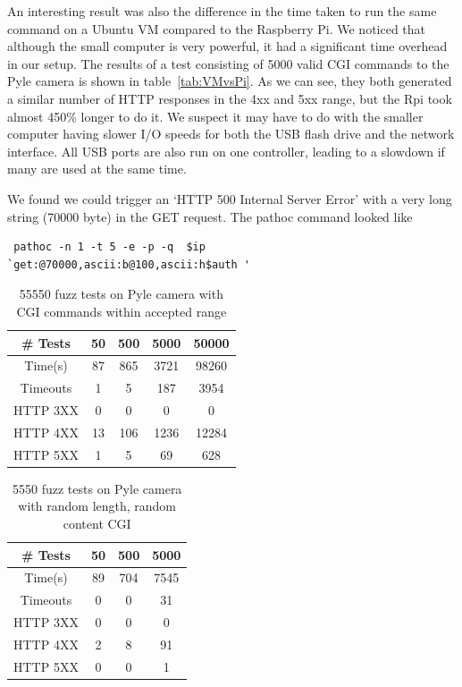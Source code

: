 \documentclass[letterpaper,twocolumn,10pt]{article}
\begin{document}
An interesting result was also the difference in the time taken to run the same command on a Ubuntu VM compared to the Raspberry Pi. We noticed that although the small computer is very powerful, it had a significant time overhead in our setup. The results of a test consisting of 5000 valid CGI commands to the Pyle camera is shown in table~\ref{tab:VMvsPi}. As we can see, they both generated a similar number of HTTP responses in the 4xx and 5xx range, but the Rpi took almost 450\% longer to do it. We suspect it may have to do with the smaller computer having slower I/O speeds for both the USB flash drive and the network interface. All USB ports are also run on one controller, leading to a slowdown if many are used at the same time.

We found we could trigger an `HTTP 500 Internal Server Error' with a very long string (70000 byte) in the GET request. The pathoc command looked like 
\begin{verbatim} pathoc -n 1 -t 5 -e -p -q  $ip 
`get:@70000,ascii:b@100,ascii:h$auth '  \end{verbatim}

\begin{table}[h]
\centering
	\begin{tabular}{ |c|c|c|c|c| }
		\hline
		\# Tests & 50 & 500 & 5000 & 50000 \\
		\hline
		\hline
		Time(s) & 87 & 865 & 3721 & 98260\\
		Timeouts & 1 & 5 & 187 & 3954 \\
		HTTP 3XX & 0 & 0 & 0 & 0\\
		HTTP 4XX & 13 & 106 & 1236 & 12284\\
		HTTP 5XX & 1 & 5 & 69 & 628\\
		\hline
	\end{tabular}
	\caption{55550 fuzz tests on Pyle camera with CGI commands within accepted range}
	\label{tab:Pyle_Good_CGI} 
\end{table}

\begin{table}[h]
\centering
	\begin{tabular}{ |c|c|c|c| }
		\hline
		\# Tests & 50 & 500 & 5000 \\
		\hline
		\hline
		Time(s) & 89 & 704 & 7545 \\
		Timeouts & 0 & 0 & 31  \\
		HTTP 3XX & 0 & 0 & 0 \\
		HTTP 4XX & 2 & 8 & 91 \\
		HTTP 5XX & 0 & 0 & 1 \\
		\hline
	\end{tabular}
	\caption{5550 fuzz tests on Pyle camera with random length, random content CGI}
	\label{tab:Pyle_Rand_CGI} 
\end{table}
\end{document}

